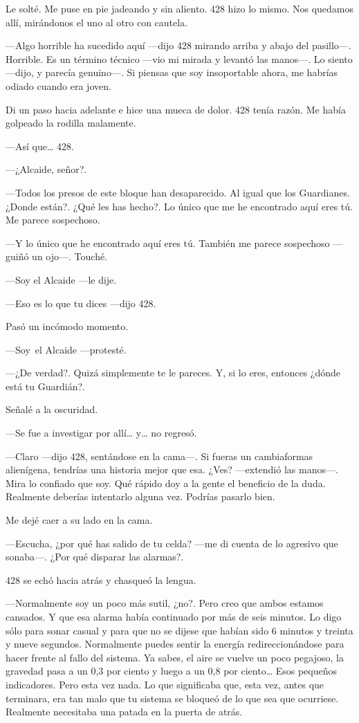 Le solté. Me puse en pie jadeando y sin aliento. 428 hizo lo mismo. Nos
quedamos allí, mirándonos el uno al otro con cautela.

---Algo horrible ha sucedido aquí ---dijo 428 mirando arriba y abajo del
pasillo---. Horrible. Es un término técnico ---vio mi mirada y levantó
las manos---. Lo siento ---dijo, y parecía genuino---. Si piensas que
soy insoportable ahora, me habrías odiado cuando era joven.

Di un paso hacia adelante e hice una mueca de dolor. 428 tenía razón. Me
había golpeado la rodilla malamente.

---Así que\ldots{} 428.

---¿Alcaide, señor?.

---Todos los presos de este bloque han desaparecido. Al igual que los
Guardianes. ¿Donde están?. ¿Qué les has hecho?. Lo único que me he
encontrado aquí eres tú. Me parece sospechoso.

---Y lo único que he encontrado aquí eres tú. También me parece
sospechoso ---guiñó un ojo---. Touché.

---Soy el Alcaide ---le dije.

---Eso es lo que tu dices ---dijo 428.

Pasó un incómodo momento.

---Soy~el Alcaide ---protesté.

---¿De verdad?. Quizá simplemente te le pareces. Y, si lo eres, entonces
¿dónde está tu Guardián?.

Señalé a la oscuridad.

---Se fue a investigar por allí\ldots{} y\ldots{} no regresó.

---Claro ---dijo 428, sentándose en la cama---. Si fueras un
cambiaformas alienígena, tendrías una historia mejor que esa. ¿Ves?
---extendió las manos---. Mira lo confiado que soy. Qué rápido doy a la
gente el beneficio de la duda. Realmente deberías intentarlo alguna vez.
Podrías pasarlo bien.

Me dejé caer a su lado en la cama.

---Escucha, ¿por qué has salido de tu celda? ---me di cuenta de lo
agresivo que sonaba---. ¿Por qué disparar las alarmas?.

428 se echó hacia atrás y chasqueó la lengua.

---Normalmente soy un poco más sutil, ¿no?. Pero creo que ambos estamos
cansados. Y que esa alarma había continuado por más de seis minutos. Lo
digo sólo para sonar casual y para que no se dijese que habían sido 6
minutos y treinta y nueve segundos. Normalmente puedes sentir la energía
redireccionándose para hacer frente al fallo del sistema. Ya sabes, el
aire se vuelve un poco pegajoso, la gravedad pasa a un 0,3 por ciento y
luego a un 0,8 por ciento\ldots{} Esos pequeños indicadores. Pero esta
vez nada. Lo que significaba que, esta vez, antes que terminara, era tan
malo que tu sistema se bloqueó de lo que sea que ocurriese. Realmente
necesitaba una patada en la puerta de atrás.

